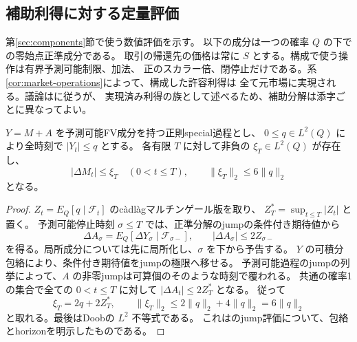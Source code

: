 \subsection{補助利得に対する定量評価}
\label{sec:ds-estimates}
第\ref{sec:components}節で使う数値評価を示す。
以下の成分は一つの確率 $Q$ の下での零始点正準成分である。
取引の帰還先の価格は常に $S$ とする。構成で使う操作は有界予測可能制限、加法、
正のスカラー倍、閉停止だけである。系\ref{cor:market-operations}によって、構成した許容利得は
全て元市場に実現される。議論は\cite[Lemmas 4.7--4.10]{DS}に従うが、
実現済み利得の族として述べるため、補助分解は添字ごとに異なってよい。

\begin{lemma}[具体的なjump包絡]\label{lem:explicit-jump-envelope}
$Y=M+A$ を予測可能FV成分を持つ正則special過程とし、
$0\leq q\in L^2(Q)$ により全時刻で $|Y_t|\leq q$ とする。
各有限 $T$ に対して非負の $\xi_T\in L^2(Q)$ が存在し、
\[
 |\Delta M_t|\leq\xi_T\quad(0<t\leq T),\qquad
 \|\xi_T\|_2\leq6\|q\|_2
\]
となる。
\end{lemma}
\begin{proof}
$Z_t=E_Q[q\mid\mathcal F_t]$ のcàdlàgマルチンゲール版を取り、
$Z_T^*=\sup_{t\leq T}|Z_t|$ と置く。
予測可能停止時刻 $\sigma\leq T$ では、正準分解のjumpの条件付き期待値から
\[
 \Delta A_\sigma=E_Q[\Delta Y_\sigma\mid\mathcal F_{\sigma-}],\qquad
 |\Delta A_\sigma|\leq2Z_{\sigma-}
\]
を得る。局所成分については先に局所化し、$\sigma$ を下から予告する。
$Y$ の可積分包絡により、条件付き期待値をjumpの極限へ移せる。
予測可能過程のjumpの列挙によって、$A$ の非零jumpは可算個のそのような時刻で覆われる。
共通の確率1の集合で全ての $0<t\leq T$ に対して $|\Delta A_t|\leq2Z_T^*$ となる。
従って
\[
 \xi_T=2q+2Z_T^*,\qquad
 \|\xi_T\|_2\leq2\|q\|_2+4\|q\|_2=6\|q\|_2
\]
と取れる。最後はDoobの $L^2$ 不等式である。
これは\cite[Corollary 2.4]{DS}のjump評価について、包絡とhorizonを明示したものである。
\end{proof}


